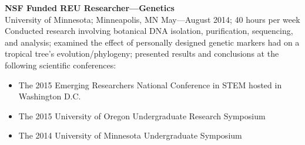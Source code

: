 \documentclass[a4paper]{article}
\begin{document}
\textbf{NSF Funded REU Researcher—Genetics}\\
\textcolor[RGB]{128,128,128}{University of Minnesota; Minneapolis, MN \hfill  May—August 2014; 40 hours per week}\\
Conducted research involving botanical DNA isolation, purification, sequencing, and analysis; examined the effect of personally designed genetic markers had on a tropical tree's evolution/phylogeny; presented results and conclusions at the following scientific conferences:\\ 
\begin{itemize}
\item The 2015 Emerging Researchers National Conference in STEM hosted in Washington D.C.
\item The 2015 University of Oregon Undergraduate Research Symposium
\item The 2014 University of Minnesota Undergraduate Symposium
\end{itemize}
\end{document}
